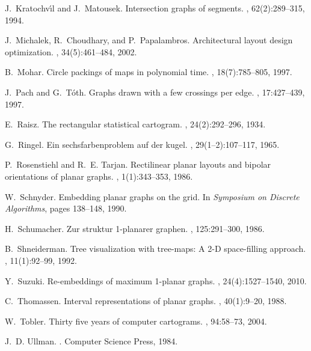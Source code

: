 \documentclass{article}
\begin{document}
\begin{thebibliography}{10}
J.~Kratochv{\'\i}l and J.~Matousek.
\newblock Intersection graphs of segments.
, 62(2):289--315, 1994.

J.~Michalek, R.~Choudhary, and P.~Papalambros.
\newblock Architectural layout design optimization.
, 34(5):461--484, 2002.

B.~Mohar.
\newblock Circle packings of maps in polynomial time.
, 18(7):785--805, 1997.

J.~Pach and G.~T{\'o}th.
\newblock Graphs drawn with a few crossings per edge.
, 17:427--439, 1997.

E.~Raisz.
\newblock The rectangular statistical cartogram.
, 24(2):292--296, 1934.

G.~Ringel.
\newblock Ein sechsfarbenproblem auf der kugel.
, 29(1--2):107--117, 1965.

P.~Rosenstiehl and R.~E. Tarjan.
\newblock Rectilinear planar layouts and bipolar orientations of planar graphs.
, 1(1):343--353, 1986.

W.~Schnyder.
\newblock Embedding planar graphs on the grid.
\newblock In {\em Symposium on Discrete Algorithms}, pages 138--148, 1990.

H.~Schumacher.
\newblock Zur struktur 1-planarer graphen.
, 125:291--300, 1986.

B.~Shneiderman.
\newblock Tree visualization with tree-maps: A {2-D} space-filling approach.
, 11(1):92--99, 1992.

Y.~Suzuki.
\newblock Re-embeddings of maximum 1-planar graphs.
, 24(4):1527--1540, 2010.

C.~Thomassen.
\newblock Interval representations of planar graphs.
, 40(1):9--20, 1988.

W.~Tobler.
\newblock Thirty five years of computer cartograms.
, 94:58--73,
  2004.

J.~D. Ullman.
.
\newblock Computer Science Press, 1984.

\end{thebibliography}
 
\end{document}
